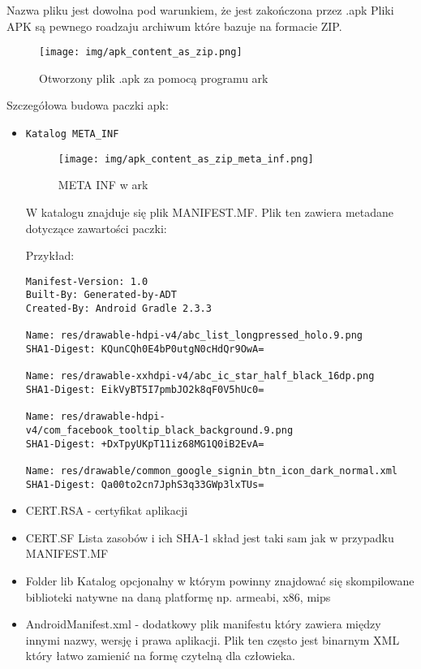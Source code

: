 \documentclass[12pt,a4paper,leqno,oneside,titlepage]{book}
\begin{document}
Nazwa pliku jest dowolna pod warunkiem, że jest zakończona przez .apk
Pliki APK są pewnego roadzaju archiwum które bazuje na formacie ZIP.

\begin{figure}[h!]
	\centering
	\texttt{[image: img/apk\_content\_as\_zip.png]}
	\caption{Otworzony plik .apk za pomocą programu ark}
\end{figure}

Szczegółowa budowa paczki apk:
\begin{itemize}
\item \texttt{Katalog META\_INF}

\begin{figure}[h!]
	\centering
	\texttt{[image: img/apk\_content\_as\_zip\_meta\_inf.png]}
	\caption{META INF w ark}
\end{figure}

W katalogu znajduje się plik MANIFEST.MF. Plik ten zawiera metadane dotyczące zawartości paczki:

Przykład:

\begin{lstlisting}
Manifest-Version: 1.0
Built-By: Generated-by-ADT
Created-By: Android Gradle 2.3.3

Name: res/drawable-hdpi-v4/abc_list_longpressed_holo.9.png
SHA1-Digest: KQunCQh0E4bP0utgN0cHdQr9OwA=

Name: res/drawable-xxhdpi-v4/abc_ic_star_half_black_16dp.png
SHA1-Digest: EikVyBT5I7pmbJO2k8qF0V5hUc0=

Name: res/drawable-hdpi-v4/com_facebook_tooltip_black_background.9.png
SHA1-Digest: +DxTpyUKpT11iz68MG1Q0iB2EvA=

Name: res/drawable/common_google_signin_btn_icon_dark_normal.xml
SHA1-Digest: Qa00to2cn7JphS3q33GWp3lxTUs=
\end{lstlisting}

\item CERT.RSA - certyfikat aplikacji
\item CERT.SF
Lista zasobów i ich SHA-1 skład jest taki sam jak w przypadku MANIFEST.MF


\item Folder lib
Katalog opcjonalny w którym powinny znajdować się skompilowane biblioteki natywne na daną platformę np. armeabi, x86, mips

\item AndroidManifest.xml - dodatkowy plik manifestu który zawiera między innymi nazwy, wersję i prawa aplikacji. Plik ten często jest binarnym XML który łatwo zamienić na formę czytelną dla człowieka.


\end{itemize}
\end{document}
